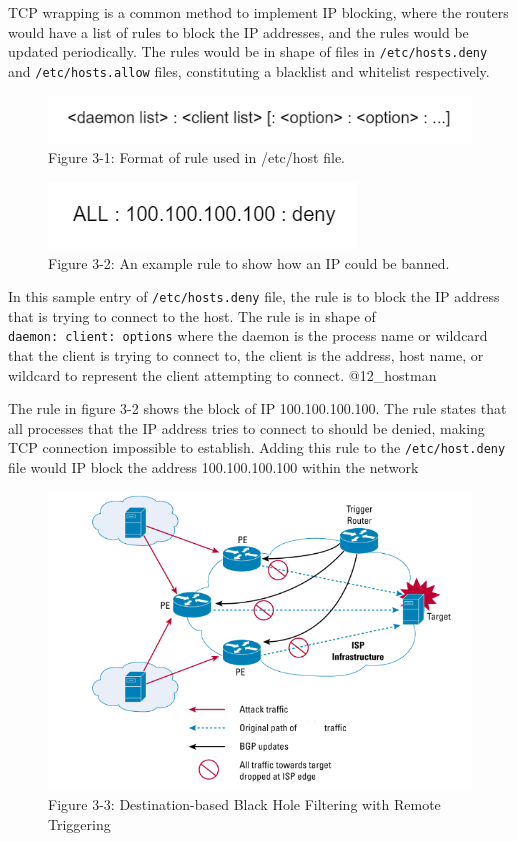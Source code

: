 TCP wrapping is a common method to implement IP blocking, where the
routers would have a list of rules to block the IP addresses, and the
rules would be updated periodically. The rules would be in shape of
files in \texttt{/etc/hosts.deny} and \texttt{/etc/hosts.allow} files,
constituting a blacklist and whitelist respectively.

\begin{figure}
\centering
\includegraphics{res/3.1-etc-host.jpg}
\caption{Figure 3-1: Format of rule used in /etc/host file.}
\end{figure}

\begin{figure}
\centering
\includegraphics{res/3.2-rule.png}
\caption{Figure 3-2: An example rule to show how an IP could be banned.}
\end{figure}

In this sample entry of \texttt{/etc/hosts.deny} file, the rule is to
block the IP address that is trying to connect to the host. The rule is
in shape of \texttt{daemon:\ client:\ options} where the daemon is the
process name or wildcard that the client is trying to connect to, the
client is the address, host name, or wildcard to represent the client
attempting to connect. @12\_hostman

The rule in figure 3-2 shows the block of IP 100.100.100.100. The rule
states that all processes that the IP address tries to connect to should
be denied, making TCP connection impossible to establish. Adding this
rule to the \texttt{/etc/host.deny} file would IP block the address
100.100.100.100 within the network

\begin{figure}
\centering
\includegraphics{res/3-3-cisco.png}
\caption{Figure 3-3: Destination-based Black Hole Filtering with Remote
Triggering}
\end{figure}

